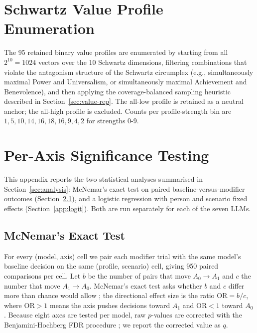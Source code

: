 \clearpage
\appendix

\section{Schwartz Value Profile Enumeration}
\label{app:profiles}


The 95 retained binary value profiles are enumerated by starting from all \(2^{10}=1024\) vectors over the 10 Schwartz dimensions, filtering combinations that violate the antagonism structure of the Schwartz circumplex \citep{schwartz2012refined} (e.g., simultaneously maximal Power and Universalism, or simultaneously maximal Achievement and Benevolence), and then applying the coverage-balanced sampling heuristic described in Section~\ref{sec:value-rep}. The all-low profile is retained as a neutral anchor; the all-high profile is excluded. Counts per profile-strength bin are \(1,5,10,14,16,18,16,9,4,2\) for strengths 0-9. 


\section{Per-Axis Significance Testing}
\label{app:lr}

This appendix reports the two statistical analyses summarised in Section~\ref{sec:analysis}: McNemar's exact test on paired baseline-versus-modifier outcomes (Section~\ref{app:mcnemar}), and a logistic regression with person and scenario fixed effects (Section~\ref{app:logit}). Both are run separately for each of the seven LLMs.

\subsection{McNemar's Exact Test}
\label{app:mcnemar}

For every (model, axis) cell we pair each modifier trial with the same model's baseline decision on the same (profile, scenario) cell, giving 950 paired comparisons per cell. Let $b$ be the number of pairs that move $A_0 \rightarrow A_1$ and $c$ the number that move $A_1 \rightarrow A_0$. McNemar's exact test asks whether $b$ and $c$ differ more than chance would allow \citep{mcnemar1947note, fagerland2013mcnemar}; the directional effect size is the ratio $\mathrm{OR} = b/c$, where $\mathrm{OR} > 1$ means the axis pushes decisions toward $A_1$ and $\mathrm{OR} < 1$ toward $A_0$. Because eight axes are tested per model, raw $p$-values are corrected with the Benjamini-Hochberg FDR procedure \citep{benjamini1995controlling}; we report the corrected value as $q$.

